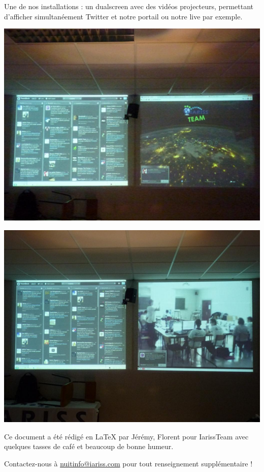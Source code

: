 \documentclass[12pt, a4paper]{article}
\newcommand{\espace}{\vspace{.8cm}}
\newcommand{\authors}{Jérémy, Florent}
\begin{document}
Une de nos installations : un dualscreen avec des vidéos projecteurs, permettant d'afficher simultanéement Twitter et notre portail ou notre live par exemple.
\espace{}
\begin{center}
\includegraphics[width=.9\textwidth, keepaspectratio=true]{img/photo1.png}
\end{center}
\espace{}
\begin{center}
\includegraphics[width=.9\textwidth, keepaspectratio=true]{img/photo2.png}
\end{center}
\espace{}



\espace\vfill{}
Ce document a été rédigé en \LaTeX{} par \authors{} pour IarissTeam avec quelques tasses de café et beaucoup de bonne humeur.

Contactez-nous à \href{mailto:nuitinfo@iariss.com}{nuitinfo@iariss.com} pour tout renseignement supplémentaire !
\end{document}
